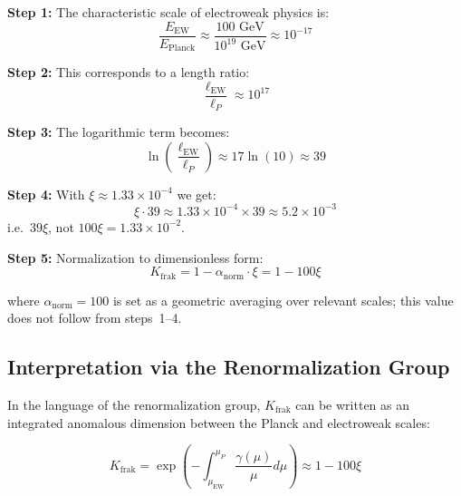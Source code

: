 	\begin{tcolorbox}[colback=yellow!5!white,colframe=orange!75!black,title={Origin of the Factor 100}]
		\textbf{Step 1:} The characteristic scale of electroweak physics is:
		\begin{equation}
			\frac{E_{\text{EW}}}{E_{\text{Planck}}} \approx \frac{100 \text{ GeV}}{10^{19} \text{ GeV}} \approx 10^{-17}
		\end{equation}
		
		\textbf{Step 2:} This corresponds to a length ratio:
		\begin{equation}
			\frac{\ell_{\text{EW}}}{\ell_P} \approx 10^{17}
		\end{equation}
		
		\textbf{Step 3:} The logarithmic term becomes:
		\begin{equation}
			\ln\left(\frac{\ell_{\text{EW}}}{\ell_P}\right) \approx 17 \ln(10) \approx 39
		\end{equation}
		
		\textbf{Step 4:} With $\xi \approx 1.33 \times 10^{-4}$ we get:
		\begin{equation}
			\xi \cdot 39 \approx 1.33 \times 10^{-4} \times 39 \approx 5.2 \times 10^{-3}
		\end{equation}
		i.e.\ $39\xi$, not $100\xi = 1.33\times10^{-2}$.
		
		\textbf{Step 5:} Normalization to dimensionless form:
		\begin{equation}
			K_{\text{frak}} = 1 - \alpha_{\text{norm}} \cdot \xi = 1 - 100\xi
		\end{equation}
		
		where $\alpha_{\text{norm}} = 100$ is set as a geometric averaging over relevant scales; this value does not follow from steps~1--4.
	\end{tcolorbox}
	
	\subsection{Interpretation via the Renormalization Group}
	
	In the language of the renormalization group, $K_{\text{frak}}$ can be written as an integrated anomalous dimension between the Planck and electroweak scales:
	
	\begin{equation}
		K_{\text{frak}} = \exp\left(-\int_{\mu_{\text{EW}}}^{\mu_P} \frac{\gamma(\mu)}{\mu} d\mu\right) \approx 1 - 100\xi
	\end{equation}
	
